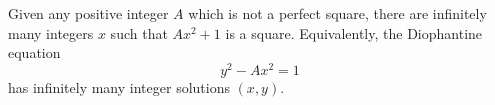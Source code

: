Given any positive integer $A$ which is not a perfect square, there are infinitely many integers $x$ such that $Ax^2 + 1$ is a square. Equivalently, the Diophantine equation
$$y^2 - Ax^2 = 1$$
has infinitely many integer solutions $(x, y)$.
